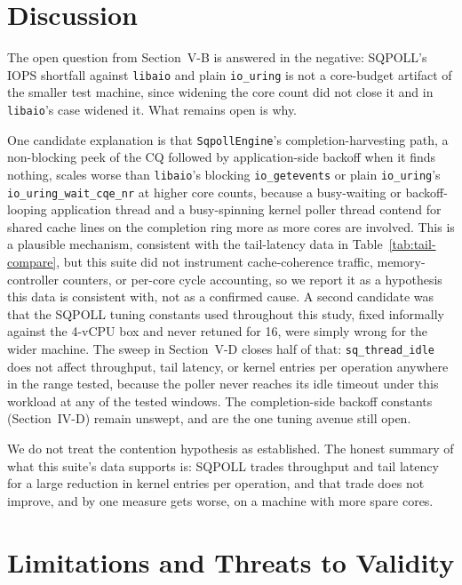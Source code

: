 \documentclass[conference]{IEEEtran}
\begin{document}
\section{Discussion}

The open question from Section~V-B is answered in the negative: SQPOLL's IOPS shortfall against
\texttt{libaio} and plain \texttt{io\_uring} is not a core-budget artifact of the smaller test
machine, since widening the core count did not close it and in \texttt{libaio}'s case widened it.
What remains open is why.

One candidate explanation is that \texttt{SqpollEngine}'s completion-harvesting path, a
non-blocking peek of the CQ followed by application-side backoff when it finds nothing, scales
worse than \texttt{libaio}'s blocking \texttt{io\_getevents} or plain \texttt{io\_uring}'s
\texttt{io\_uring\_wait\_cqe\_nr} at higher core counts, because a busy-waiting or
backoff-looping application thread and a busy-spinning kernel poller thread contend for shared
cache lines on the completion ring more as more cores are involved. This is a plausible
mechanism, consistent with the tail-latency data in Table~\ref{tab:tail-compare}, but this suite
did not instrument cache-coherence traffic, memory-controller counters, or per-core cycle
accounting, so we report it as a hypothesis this data is consistent with, not as a confirmed
cause. A second candidate was that the SQPOLL tuning constants used throughout this study, fixed
informally against the 4-vCPU box and never retuned for 16, were simply wrong for the wider
machine. The sweep in Section~V-D closes half of that: \texttt{sq\_thread\_idle} does not affect
throughput, tail latency, or kernel entries per operation anywhere in the range tested, because
the poller never reaches its idle timeout under this workload at any of the tested windows. The
completion-side backoff constants (Section~IV-D) remain unswept, and are the one tuning avenue
still open.

We do not treat the contention hypothesis as established. The honest summary of what this suite's data
supports is: SQPOLL trades throughput and tail latency for a large reduction in kernel entries
per operation, and that trade does not improve, and by one measure gets worse, on a machine with
more spare cores.

\section{Limitations and Threats to Validity}
\end{document}
